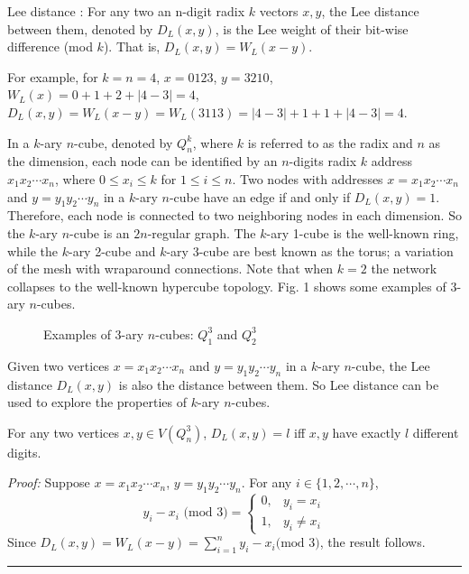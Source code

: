 \documentclass[preprint,number,12pt]{elsarticle}
\begin{document}
\begin{defn}Lee distance \cite{Bose1995-p1021-1030}:
For any two an n-digit radix $k$ vectors $x, y$, the Lee distance between them, denoted by $D_{L}(x, y)$, is the Lee weight of their bit-wise difference (mod $k$). That is, $D_L(x, y) = W_L(x-y)$.
\end{defn}

For example, for $k=n=4$, $x = 0123$, $y = 3210$, $W_{L}(x) = 0+1+2+|4-3| = 4$, $D_{L}(x, y) = W_{L}(x-y) = W_{L}(3113) = |4-3|+1+1+|4-3| = 4$.

In a $k$-ary $n$-cube, denoted by $Q_n^k$, where $k$ is referred to as the radix and $n$ as the dimension, each node can be identified by an $n$-digits radix $k$ address $x_{1}x_{2} \cdots x_{n}$, where $0 \leq x_{i} \leq k$ for $1 \leq i \leq n$.
Two nodes with addresses $x = x_{1}x_{2} \cdots x_{n}$ and $y = y_{1}y_{2} \cdots y_{n}$ in a $k$-ary $n$-cube have
an edge if and only if $D_L(x, y) = 1$. Therefore, each node is connected to two neighboring nodes
in each dimension. So the $k$-ary $n$-cube is an $2n$-regular graph.
The $k$-ary 1-cube is the well-known ring, while the $k$-ary 2-cube and $k$-ary 3-cube are best known as the torus; a variation of the mesh with wraparound connections. Note that when $k = 2$ the network collapses to the well-known hypercube topology. Fig. 1 shows some examples of $3$-ary $n$-cubes.

\begin{figure}\centering
{}
\caption{Examples of 3-ary $n$-cubes: $Q_{1}^{3}$ and $Q_2^{3}$}
\end{figure}

Given two vertices $x = x_{1}x_{2} \cdots x_{n}$ and $y = y_{1}y_{2} \cdots y_{n}$ in a $k$-ary $n$-cube, the Lee distance $D_L(x, y)$ is also the distance between them. So Lee distance can be used to explore the properties of $k$-ary $n$-cubes.

\begin{lem}\label{dl}
For any two vertices $x, y\in V(Q_n^3)$, $D_{L}(x, y)=l$ iff $x, y$ have exactly $l$ different digits.
\end{lem}
\emph{Proof:}  Suppose $x= x_{1}x_{2} \cdots x_{n}$, $y = y_{1}y_{2} \cdots y_{n}$.
For any $i\in \{1, 2, \cdots, n\}$,
\begin{equation}\label{eq:rayleigh_pdf} y_i -x_i \mbox{\  (mod 3)}=\left\{
        \begin{array}
            {ll}0,&y_i=x_i \\
            1,&y_i\not=x_i
        \end{array}
    \right.
\end{equation}
Since $D_L(x, y) = W_L(x-y)=\sum_{i=1}^n y_i -x_i\mbox{(mod 3)}$,  the result follows. \hfill\rule{1mm}{2mm}
\end{document}
